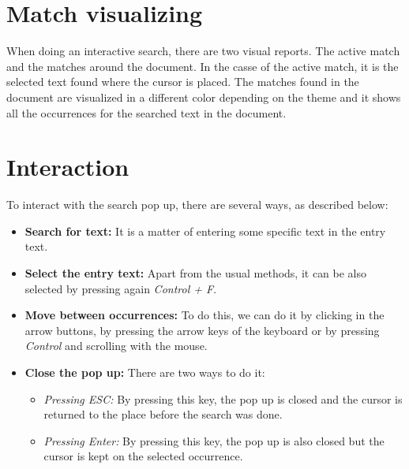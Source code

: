 
\newpage
\section{Match visualizing}

When doing an interactive search,  there are two visual reports. The active match and the matches around the document. 
In the casse of the active match,  it is the selected text found where the cursor is placed. The matches found 
in the document are visualized 
in a different color depending on the theme and it shows all the occurrences for the searched text in the document.


\section{Interaction}

To interact with the search pop up, there are several ways, as described below:
\begin{itemize}
  \item \textbf{Search for text:} It is a matter of entering some specific text in the entry text.
  \item \textbf{Select the entry text:} Apart from the usual methods, it can be also selected by pressing again \emph{Control + F}.
  \item \textbf{Move between occurrences:} To do this, we can do it by clicking in the arrow buttons, by pressing the arrow keys of the keyboard or by pressing \emph{Control} and scrolling with the mouse.
  \item \textbf{Close the pop up:} There are two ways to do it:
    \begin{itemize}
      \item \textit{Pressing ESC:} By pressing this key, the pop up is closed and the cursor is returned to the place before the search was done.
      \item \textit{Pressing Enter:} By pressing this key, the pop up is also closed but the cursor is kept on the selected occurrence.
    \end{itemize}
\end{itemize}
